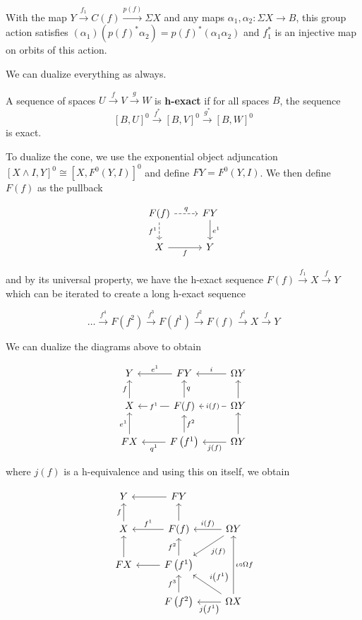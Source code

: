 With the map $Y\overset{f_1}\to C(f)\overset{p(f)}\to\Sigma X$ and any maps $\alpha_1,\alpha_2:\Sigma X\to B$, this group action satisfies $\left(\alpha_1\right)\left(p(f)^*\alpha_2\right)=p(f)^*\left(\alpha_1\alpha_2\right)$ and $f_1^*$ is an injective map on orbits of this action.

We can dualize everything as always.

A sequence of spaces $U\overset f\to V\overset g\to W$ is \textbf{h-exact} if for all spaces $B$, the sequence
\[[B,U]^0\overset{f^*}\to[B,V]^0\overset{g^*}\to[B,W]^0\]
is exact.

To dualize the cone, we use the exponential object adjuncation $\left[X\wedge I,Y\right]^0\cong\left[X,F^0(Y,I)\right]^0$ and define $FY=F^0(Y,I)$. We then define $F(f)$ as the pullback

\[\begin{tikzcd}
	{F(f)} & FY \\
	X & Y
	\arrow["f"', from=2-1, to=2-2]
	\arrow["{e^1}", from=1-2, to=2-2]
	\arrow["{f^1}"', dashed, from=1-1, to=2-1]
	\arrow["q", dashed, from=1-1, to=1-2]
\end{tikzcd}\]

and by its universal property, we have the h-exact sequence $F(f)\overset{f_1}\to X\overset f\to Y$ which can be iterated to create a long h-exact sequence

\[\dots\overset{f^4}\to F\left(f^2\right)\overset{f^3}\to F\left(f^1\right)\overset{f^2}\to F(f)\overset{f^1}\to X\overset f\to Y\]

We can dualize the diagrams above to obtain

\[\begin{tikzcd}
	Y & FY & {\Omega Y} \\
	X & {F(f)} & {\Omega Y} \\
	FX & {F\left(f^1\right)} & {\Omega Y}
	\arrow["{e^1}"', from=1-2, to=1-1]
	\arrow["f", from=2-1, to=1-1]
	\arrow["{f^1}"{description}, from=2-2, to=2-1]
	\arrow["q"', from=2-2, to=1-2]
	\arrow["i"', from=1-3, to=1-2]
	\arrow["{e^1}", from=3-1, to=2-1]
	\arrow["{f^2}"', from=3-2, to=2-2]
	\arrow["{q^1}", from=3-2, to=3-1]
	\arrow["{i(f)}"{description}, from=2-3, to=2-2]
	\arrow[from=2-3, to=1-3]
	\arrow[from=3-3, to=2-3]
	\arrow["{j(f)}", from=3-3, to=3-2]
\end{tikzcd}\]

where $j(f)$ is a h-equivalence and using this on itself, we obtain

\[\begin{tikzcd}
	Y & FY \\
	X & {F(f)} & {\Omega Y} \\
	FX & {F\left(f^1\right)} \\
	& {F\left(f^2\right)} & {\Omega X}
	\arrow[from=1-2, to=1-1]
	\arrow["f", from=2-1, to=1-1]
	\arrow["{f^1}"', from=2-2, to=2-1]
	\arrow[from=2-2, to=1-2]
	\arrow[from=3-1, to=2-1]
	\arrow["{f^2}", from=3-2, to=2-2]
	\arrow[from=3-2, to=3-1]
	\arrow["{i(f)}"', from=2-3, to=2-2]
	\arrow["{i\left(f^1\right)}"', from=4-3, to=3-2]
	\arrow["{j(f)}", from=2-3, to=3-2]
	\arrow["{f^3}", from=4-2, to=3-2]
	\arrow["{j\left(f^1\right)}", from=4-3, to=4-2]
	\arrow["{\iota\circ\Omega f}"', from=4-3, to=2-3]
\end{tikzcd}\]

